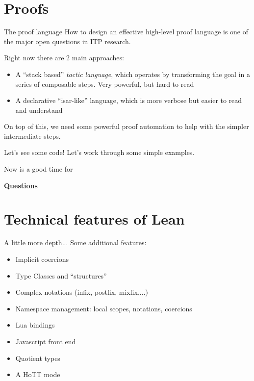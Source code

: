\documentclass{beamer}
\begin{document}
\section{Proofs}

\begin{frame}{The proof language}
  How to design an effective high-level proof language is one of the
  major open questions in ITP research.\bigskip

  Right now there are 2 main approaches:
  \begin{itemize}
  \item A ``stack based'' \emph{tactic language}, which operates by
    transforming the goal in a series of composable steps. Very
    powerful, but hard to read
  \item A declarative ``isar-like'' language, which is more verbose
    but easier to read and understand
  \end{itemize}
  
  On top of this, we need some powerful proof automation to help with
  the simpler intermediate steps.
\end{frame}

\begin{frame}{Let's see some code!}
  Let's work through some simple examples.\bigskip

  Now is a good time for
  \begin{center}
    {\huge \bf Questions}
  \end{center}
\end{frame}

\section{Technical features of Lean}

\begin{frame}[fragile]{A little more depth...}
  Some additional features:
  \begin{itemize}
  \item Implicit coercions
  \item Type Classes and ``structures''
  \item Complex notations (infix, postfix, mixfix,...)
  \item Namespace management: local scopes, notations, coercions
  \item Lua bindings
  \item Javascript front end
  \item Quotient types
  \item A HoTT mode
  \end{itemize}
\end{frame}
\end{document}

